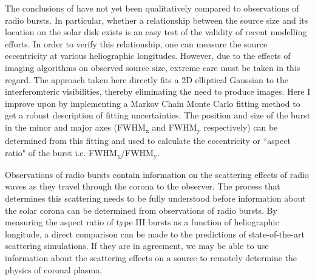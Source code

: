 The conclusions of \cite{Kontar2019} have not yet been qualitatively compared to observations of radio bursts. In particular, whether a relationship between the source size and its location on the solar disk exists is an easy test of the validity of recent modelling efforts. In order to verify this relationship, one can measure the source eccentricity at various heliographic longitudes. However, due to the effects of imaging algorithms on observed source size, extreme care must be taken in this regard. The approach taken here directly fits a 2D elliptical Gaussian to the interferomteric visibilities, thereby eliminating the need to produce images. Here I improve upon \cite{Murphy2021} by implementing a Markov Chain Monte Carlo fitting method to get a robust description of fitting uncertainties. The position and size of the burst in the minor and major axes (FWHM\textsubscript{x} and FWHM\textsubscript{y} respectively) can be determined from this fitting and used to calculate the eccentricity or ``aspect ratio"  of the burst i.e. FWHM\textsubscript{x}/FWHM\textsubscript{y}.

Observations of radio bursts contain information on the scattering effects of radio waves as they travel through the corona to the observer. The process that determines this scattering needs to be fully understood before information about the solar corona can be determined from observations of radio bursts.
By measuring the aspect ratio of type III bursts as a function of heliographic longitude, a direct comparison can be made to the predictions of state-of-the-art scattering simulations. If they are in agreement, we may be able to use information about the scattering effects on a source to remotely determine the physics of coronal plasma.


